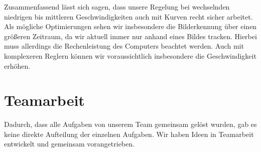 \documentclass[10pt]{article}
\begin{document}
    Zusammenfassend lässt sich sagen, dass unsere Regelung bei wechselnden niedrigen bis mittleren Geschwindigkeiten auch mit Kurven recht sicher arbeitet.
    Als mögliche Optimierungen sehen wir insbesondere die Bilderkennung über einen größeren Zeitraum, da wir aktuell immer nur anhand eines Bildes tracken.
    Hierbei muss allerdings die Rechenleistung des Computers beachtet werden.
    Auch mit komplexeren Reglern können wir voraussichtlich insbesondere die Geschwindigkeit erhöhen.

\section{Teamarbeit}
    Dadurch, dass alle Aufgaben von unserem Team gemeinsam gelöst wurden, gab es keine direkte Aufteilung der einzelnen Aufgaben.
    Wir haben Ideen in Teamarbeit entwickelt und gemeinsam vorangetrieben.
\end{document}
